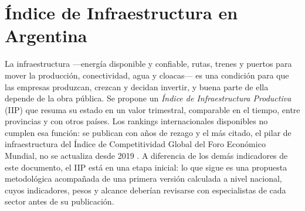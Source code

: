 %

\section{Índice de Infraestructura en Argentina}

La infraestructura ---energía disponible y confiable, rutas, trenes y puertos para mover la producción, conectividad, agua y cloacas--- es una condición para que las empresas produzcan, crezcan y decidan invertir, y buena parte de ella depende de la obra pública. Se propone un \emph{Índice de Infraestructura Productiva} (IIP) que resuma su estado en un valor trimestral, comparable en el tiempo, entre provincias y con otros países. Los rankings internacionales disponibles no cumplen esa función: se publican con años de rezago y el más citado, el pilar de infraestructura del Índice de Competitividad Global del Foro Económico Mundial, no se actualiza desde 2019 \cite{wef_gci}. A diferencia de los demás indicadores de este documento, el IIP está en una etapa inicial: lo que sigue es una propuesta metodológica acompañada de una primera versión calculada a nivel nacional, cuyos indicadores, pesos y alcance deberían revisarse con especialistas de cada sector antes de su publicación.

